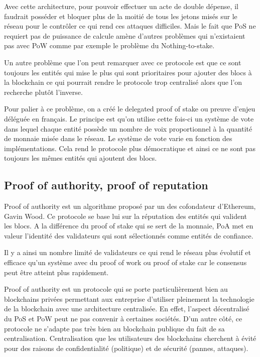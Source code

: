 Avec cette architecture, pour pouvoir effectuer un acte de double dépense, il faudrait posséder et bloquer plus de la moitié de tous les jetons misés sur le réseau pour le contrôler ce qui rend ces attaques difficiles. Mais le fait que PoS ne requiert pas de puissance de calcule amène d'autres problèmes qui n'existaient pas avec PoW comme par exemple le problème du Nothing-to-stake.

Un autre problème que l'on peut remarquer avec ce protocole est que ce sont toujours les entités qui mise le plus qui sont prioritaires pour ajouter des blocs à la blockchain ce qui pourrait rendre le protocole trop centralisé alors que l'on recherche plutôt l'inverse. 

Pour palier à ce problème, on a créé le delegated proof of stake ou preuve d'enjeu déléguée en français. Le principe est qu'on utilise cette fois-ci un système de vote dans lequel chaque entité possède un nombre de voix proportionnel à la quantité de monnaie misée dans le réseau. Le système de vote varie en fonction des implémentations. Cela rend le protocole plus démocratique et ainsi ce ne sont pas toujours les mêmes entités qui ajoutent des blocs.

\subsection{Proof of authority, proof of reputation}

Proof of authority est un algorithme proposé par un des cofondateur d'Ethereum, Gavin Wood. Ce protocole se base lui sur la réputation des entités qui valident les blocs. A la différence du proof of stake qui se sert de la monnaie, PoA met en valeur l'identité des validateurs qui sont sélectionnés comme entités de confiance.

Il y a ainsi un nombre limité de validateurs ce qui rend le réseau plus évolutif et efficace qu'un système avec du proof of work ou proof of stake car le consensus peut être atteint plus rapidement.

Proof of authority est un protocole qui se porte particulièrement bien au blockchains privées permettant aux entreprise d'utiliser pleinement la technologie de la blockchain avec une architecture centralisée. En effet, l'aspect décentralisé du PoS et PoW peut ne pas convenir à certaines sociétés. D'un autre côté, ce protocole ne s'adapte pas très bien au blockchain publique du fait de sa centralisation. Centralisation que les utilisateurs des blockchains cherchent à évité pour des raisons de confidentialité (politique) et de sécurité (pannes, attaques).

